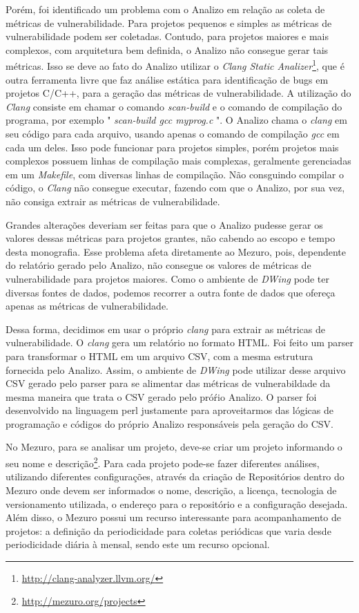 Porém, foi identificado um problema com o Analizo em relação as coleta de métricas de vulnerabilidade. Para projetos pequenos e simples as métricas de vulnerabilidade podem ser coletadas.  Contudo, para projetos maiores e mais complexos, com arquitetura bem definida, o Analizo não consegue gerar tais métricas. Isso se deve ao fato do Analizo utilizar o \emph{Clang Static Analizer}\footnote{\url{http://clang-analyzer.llvm.org/}}, que é outra ferramenta livre que faz análise estática para identificação de bugs em projetos C/C++, para a geração das métricas de vulnerabilidade. A utilização do \emph{Clang} consiste em chamar o comando \emph{scan-build}  e o comando de compilação do programa, por exemplo " \emph{scan-build gcc myprog.c} ". O Analizo chama o \emph{clang} em seu código para cada arquivo, usando apenas o comando  de compilação \emph{gcc} em cada um deles. Isso pode funcionar para projetos simples, porém projetos mais complexos possuem linhas de compilação mais complexas, geralmente gerenciadas em um \emph{Makefile}, com diversas linhas de compilação. Não consguindo compilar o código, o \emph{Clang} não consegue executar, fazendo com que o Analizo, por sua vez, não consiga extrair as métricas de vulnerabilidade. 

Grandes alterações deveriam ser feitas para que o Analizo pudesse gerar os valores dessas métricas para projetos grantes, não cabendo ao escopo e tempo desta monografia. Esse problema afeta diretamente ao Mezuro, pois, dependente do relatório gerado pelo Analizo, não consegue os valores de métricas de vulnerabilidade para projetos maiores. Como o ambiente de \emph{DWing} pode ter diversas fontes de dados, podemos recorrer a outra fonte de dados que ofereça apenas as métricas de vulnerabilidade.

Dessa forma, decidimos em usar o próprio  \emph{clang} para extrair as métricas de vulnerabilidade. O \emph{clang} gera um relatório no formato HTML. Foi feito um parser para transformar o HTML em um arquivo CSV, com a mesma estrutura fornecida pelo Analizo. Assim, o ambiente de \emph{DWing} pode utilizar desse arquivo CSV gerado pelo parser para se alimentar das métricas de vulnerabildade da mesma maneira que trata o CSV gerado pelo próŕio Analizo. O parser foi desenvolvido na linguagem perl justamente para aproveitarmos das lógicas de programação e códigos do próprio Analizo responsáveis pela geração do CSV.

No Mezuro, para se analisar um projeto, deve-se criar um projeto informando o seu nome e descrição\footnote{\url{http://mezuro.org/projects}}. Para cada projeto pode-se fazer diferentes análises, utilizando diferentes configurações, através da criação de Repositórios dentro do Mezuro onde devem ser informados o nome, descrição, a licença, tecnologia de versionamento utilizada, o endereço para o repositório e a configuração desejada. Além disso, o Mezuro possui um recurso interessante para acompanhamento de projetos: a definição da periodicidade para coletas periódicas que varia desde periodicidade diária à mensal, sendo este um recurso opcional.

